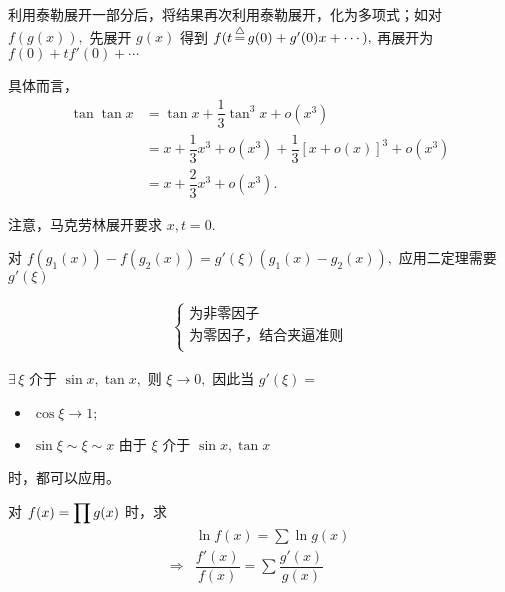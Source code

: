 
利用泰勒展开一部分后，将结果再次利用泰勒展开，化为多项式；如对
$ f(g(x)), $ 先展开 $ g(x) $ 得到 $ f(t \mathop{=}\limits^\triangle g(0) + g'(0)x + \cdots), $ 
再展开为 $ f(0) + tf'(0) + \cdots $ 

具体而言，
\begin{equation*}
    \begin{aligned}
        \tan \tan x 
        &= \tan x + \dfrac{1}{3}\tan^3 x + o(x^3)\\ 
        &= x + \dfrac{1}{3}x^3 + o(x^3) + \dfrac{1}{3}[x + o(x)]^3 + o(x^3)
        \\&= x + \dfrac{2}{3}x^3 + o(x^3).
    \end{aligned}
\end{equation*}

注意，马克劳林展开要求 $ x,t = 0. $ 


对 $ f(g_1(x)) - f(g_2(x)) = g'(\xi)(g_1(x) - g_2(x)), $ 应用二定理需要 $ g'(\xi) $ 

\begin{equation*}
    \begin{aligned}
        \begin{cases}
            \textrm{为非零因子}\\ 
            \textrm{为零因子，结合夹逼准则}\\
        \end{cases}
    \end{aligned}
\end{equation*}

$ \exists\, \xi $ 介于 $ \sin x, \tan x, $ 则
$ \xi \rightarrow 0, $ 因此当 $ g'(\xi) =  $ 
\begin{itemize}
    \item $ \cos \xi \rightarrow 1; $ 
    \item $ \sin \xi \sim \xi \sim x $ 由于 $ \xi $ 介于 $ \sin x, \tan x $ 
\end{itemize}
时，都可以应用。


对 $ \displaystyle f(x) = \prod g(x) $ 时，求
\begin{equation*}
    \begin{aligned}
        &\ln f(x) = \sum \ln g(x) \\ 
        \Rightarrow & \dfrac{f'(x)}{f(x)} = \sum \dfrac{g'(x)}{g(x)}
    \end{aligned}
\end{equation*}

